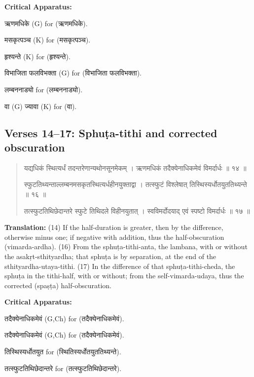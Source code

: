 \documentclass[11pt,a4paper]{article}
\newcommand{\dev}[1]{{\devanagarifont #1}}
\newenvironment{sanskritverse}{%
  \begin{quote}%
  \devanagarifont%
  \setlength{\leftmargin}{2em}%
}{\end{quote}}
\newenvironment{variants}{%
  \small%
  \color{varecolor}%
  \list{}{\leftmargin=2em\itemindent=-1em}%
}{\endlist}
\begin{document}
\textcolor{varecolor}{\textbf{Critical Apparatus:}}
\begin{variants}
\item[5.1] \dev{ऋणमधिके} (G) \dev{for} (\dev{ऋणमधिके}).
\item[5.2] \dev{मसकृत्पञ्च} (K) \dev{for} (\dev{मसकृत्पञ्च}).
\item[5.3] \dev{हृश्यन्ते} (K) \dev{for} (\dev{हृश्यन्ते}).
\item[6.1] \dev{विभाजिता फलविभक्ता} (G) \dev{for} (\dev{विभाजिता फलविभक्ता}).
\item[6.2] \dev{लम्बननाड्यो} \dev{for} (\dev{लम्बननाड्यो}).
\item[8.1] \dev{वा} (G) \dev{ज्यावा} (K) \dev{for} (\dev{वा}).
\end{variants}

\subsection*{Verses 14--17: Sphuṭa-tithi and corrected obscuration}

\begin{sanskritverse}
\dev{यद्यधिकं स्थित्यर्धं तदन्तरेणान्यथोनसूनमेकम्} ।
\dev{ऋणमधिकं तदैक्येनाधिकमेवं विमर्दार्धः ॥ १४ ॥}

\dev{स्फुटतिथ्यन्ताल्लम्बनमसकृतस्थित्यर्धहीनयुक्ताद्वा} ।
\dev{तत्स्फुटं विश्लेषात् तिस्थिस्यर्धोतयुततिथ्यन्ते ॥ १६ ॥}

\dev{तत्स्फुटतिथिछेदान्तरे स्फुटे तिथिदले विहीनयुतात्} ।
\dev{स्वविमर्दोदयाद् एवं स्पष्टो विमर्दार्धः ॥ १७ ॥}
\end{sanskritverse}

\textbf{Translation:} (14) If the half-duration is greater, then by the difference, 
otherwise minus one; if negative with addition, thus the half-obscuration (vimarda-ardha). 
(16) From the sphuṭa-tithi-anta, the lambana, with or without the asakṛt-sthityardha; 
that sphuṭa is by separation, at the end of the sthityardha-utaya-tithi. (17) In the 
difference of that sphuṭa-tithi-cheda, the sphuṭa in the tithi-half, with or without; 
from the self-vimarda-udaya, thus the corrected (spaṣṭa) half-obscuration.

\textcolor{varecolor}{\textbf{Critical Apparatus:}}
\begin{variants}
\item[14.1] \dev{तदैक्येनाधिकमेवं} (G,Ch) \dev{for} (\dev{तदैक्येनाधिकमेवं}).
\item[15.1] \dev{तदैक्येनाधिकमेवं} (G,Ch) \dev{for} (\dev{तदैक्येनाधिकमेवं}).
\item[16.1] \dev{तिस्थिस्यर्धोतयुत} \dev{for} (\dev{स्थितिस्यर्धोतयुततिथ्यन्ते}).
\item[17.1] \dev{तत्स्फुटतिथिछेदान्तरे} \dev{for} (\dev{तत्स्फुटतिथिछेदान्तरे}).
\end{variants}
\end{document}
